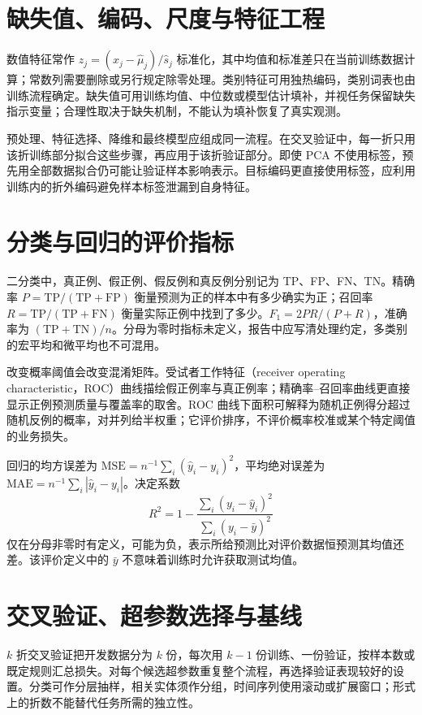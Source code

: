 \documentclass[UTF8,12pt,a4paper,fontset=fandol]{ctexbook}
\begin{document}
\section{缺失值、编码、尺度与特征工程}

数值特征常作 $z_j=(x_j-\widehat\mu_j)/\widehat s_j$ 标准化，其中均值和标准差只在当前训练数据计算；常数列需要删除或另行规定除零处理。类别特征可用独热编码，类别词表也由训练流程确定。缺失值可用训练均值、中位数或模型估计填补，并视任务保留缺失指示变量；合理性取决于缺失机制，不能认为填补恢复了真实观测。

预处理、特征选择、降维和最终模型应组成同一流程。在交叉验证中，每一折只用该折训练部分拟合这些步骤，再应用于该折验证部分。即使 PCA 不使用标签，预先用全部数据拟合仍可能让验证样本影响表示。目标编码更直接使用标签，应利用训练内的折外编码避免样本标签泄漏到自身特征。

\section{分类与回归的评价指标}

二分类中，真正例、假正例、假反例和真反例分别记为 TP、FP、FN、TN。精确率 $P=\mathrm{TP}/(\mathrm{TP}+\mathrm{FP})$ 衡量预测为正的样本中有多少确实为正；召回率 $R=\mathrm{TP}/(\mathrm{TP}+\mathrm{FN})$ 衡量实际正例中找到了多少。$F_1=2PR/(P+R)$，准确率为 $(\mathrm{TP}+\mathrm{TN})/n$。分母为零时指标未定义，报告中应写清处理约定，多类别的宏平均和微平均也不可混用。

改变概率阈值会改变混淆矩阵。受试者工作特征（receiver operating characteristic，ROC）曲线描绘假正例率与真正例率；精确率--召回率曲线更直接显示正例预测质量与覆盖率的取舍。ROC 曲线下面积可解释为随机正例得分超过随机反例的概率，对并列给半权重；它评价排序，不评价概率校准或某个特定阈值的业务损失。

回归的均方误差为 $\mathrm{MSE}=n^{-1}\sum_i(\widehat y_i-y_i)^2$，平均绝对误差为 $\mathrm{MAE}=n^{-1}\sum_i|\widehat y_i-y_i|$。决定系数
\[
 R^2=1-\frac{\sum_i(y_i-\widehat y_i)^2}{\sum_i(y_i-\bar y)^2}
\]
仅在分母非零时有定义，可能为负，表示所给预测比对评价数据恒预测其均值还差。该评价定义中的 $\bar y$ 不意味着训练时允许获取测试均值。

\section{交叉验证、超参数选择与基线}

$k$ 折交叉验证把开发数据分为 $k$ 份，每次用 $k-1$ 份训练、一份验证，按样本数或既定规则汇总损失。对每个候选超参数重复整个流程，再选择验证表现较好的设置。分类可作分层抽样，相关实体须作分组，时间序列使用滚动或扩展窗口；形式上的折数不能替代任务所需的独立性。
\end{document}
